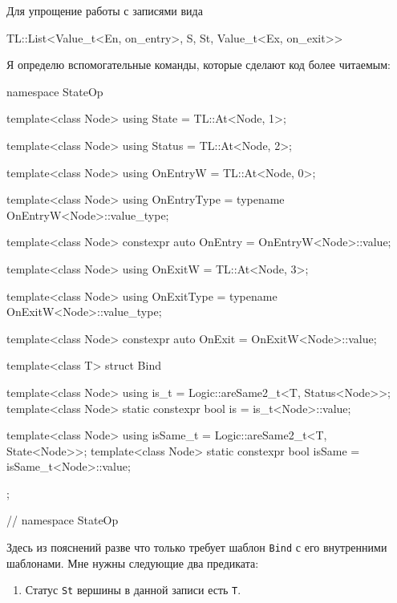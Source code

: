 \documentclass{article}
\begin{document}
{Для упрощение работы с записями вида
\begin{cppcode}[\nonumbers]
TL::List<Value_t<En, on_entry>, S, St, Value_t<Ex, on_exit>>
\end{cppcode}
Я определю вспомогательные команды, которые сделают код более читаемым:
\begin{cppcode}[\nonumbers]
namespace StateOp {
template<class Node>
using State = TL::At<Node, 1>;

template<class Node>
using Status = TL::At<Node, 2>;

template<class Node>
using OnEntryW = TL::At<Node, 0>;

template<class Node>
using OnEntryType = typename OnEntryW<Node>::value_type;

template<class Node>
constexpr auto OnEntry = OnEntryW<Node>::value;

template<class Node>
using OnExitW = TL::At<Node, 3>;

template<class Node>
using OnExitType = typename OnExitW<Node>::value_type;

template<class Node>
constexpr auto OnExit = OnExitW<Node>::value;

template<class T>
struct Bind {
  template<class Node>
  using is_t = Logic::areSame2_t<T, Status<Node>>;
  template<class Node>
  static constexpr bool is = is_t<Node>::value;

  template<class Node>
  using isSame_t = Logic::areSame2_t<T, State<Node>>;
  template<class Node>
  static constexpr bool isSame = isSame_t<Node>::value;
};
} // namespace StateOp
\end{cppcode}
Здесь из пояснений разве что только требует шаблон \verb"Bind" с его внутренними шаблонами.
Мне нужны следующие два предиката:
\begin{enumerate}
\item Статус \verb"St" вершины в данной записи есть \verb"T".


\end{enumerate}}
\end{document}
